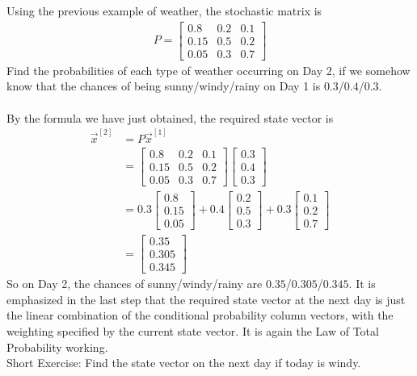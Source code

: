 \begin{exmp}
\label{1402}
Using the previous example of weather, the stochastic matrix is
\begin{align*}
P = 
\begin{bmatrix}
0.8 & 0.2 & 0.1\\
0.15 & 0.5 & 0.2 \\
0.05 & 0.3 & 0.7
\end{bmatrix}   
\end{align*}
Find the probabilities of each type of weather occurring on Day 2, if we somehow know that the chances of being sunny/windy/rainy on Day 1 is $0.3$/$0.4$/$0.3$. \\
\\
By the formula we have just obtained, the required state vector is
\begin{align*}
\vec{x}^{[2]} &= P\vec{x}^{[1]} \\
&=
\begin{bmatrix}
0.8 & 0.2 & 0.1\\
0.15 & 0.5 & 0.2 \\
0.05 & 0.3 & 0.7
\end{bmatrix}   
\begin{bmatrix}
0.3 \\
0.4 \\
0.3
\end{bmatrix} \\
&= 0.3
\begin{bmatrix}
0.8 \\
0.15 \\
0.05
\end{bmatrix}
+ 0.4
\begin{bmatrix}
0.2 \\
0.5 \\
0.3
\end{bmatrix}
+ 0.3
\begin{bmatrix}
0.1 \\
0.2 \\
0.7
\end{bmatrix} \\
&=
\begin{bmatrix}
0.35 \\
0.305 \\
0.345
\end{bmatrix}
\end{align*}
So on Day 2, the chances of sunny/windy/rainy are $0.35$/$0.305$/$0.345$. It is emphasized in the last step that the required state vector at the next day is just the linear combination of the conditional probability column vectors, with the weighting specified by the current state vector. It is again the Law of Total Probability working.\\
Short Exercise: Find the state vector on the next day if today is windy.
\end{exmp}

